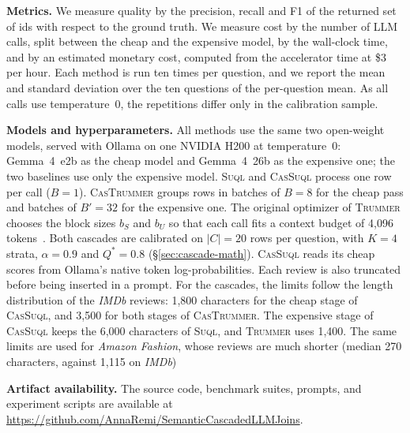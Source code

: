 \documentclass[sigconf]{acmart}
\begin{document}
\textbf{Metrics.} We measure quality by the precision, recall and F1 of the returned set of ids with respect to the ground truth. We measure cost by the number of LLM calls, split between the cheap and the expensive model, by the wall-clock time, and by an estimated monetary cost, computed from the accelerator time at \$3 per hour. Each method is run ten times per question, and we report the mean and standard deviation over the ten questions of the per-question mean. As all calls use temperature~0, the repetitions differ only in the calibration sample.

\textbf{Models and hyperparameters.} All methods use the same two open-weight models, served with Ollama on one NVIDIA H200 at temperature~0: Gemma~4~e2b as the cheap model and Gemma~4~26b as the expensive one; the two baselines use only the expensive model.
\textsc{Suql} and \textsc{CasSuql} process one row per call ($B{=}1$). \textsc{CasTrummer} groups rows in batches of $B{=}8$ for the cheap pass and batches of $B'{=}32$ for the expensive one.
The original optimizer of \textsc{Trummer} chooses the block sizes $b_S$ and $b_U$ so that each call fits a context budget of 4,096 tokens~\cite{trummer2025semanticjoin}.
Both cascades are calibrated on $|C|{=}20$ rows per question, with $K{=}4$ strata, $\alpha{=}0.9$ and $Q^\ast{=}0.8$ (\S\ref{sec:cascade-math}). \textsc{CasSuql} reads its cheap scores from Ollama's native token log-probabilities.
Each review is also truncated before being inserted in a prompt.
For the cascades, the limits follow the length distribution of the \textit{IMDb} reviews: 1,800 characters for the cheap stage of \textsc{CasSuql}, and 3,500 for both stages of \textsc{CasTrummer}.
The expensive stage of \textsc{CasSuql} keeps the 6,000 characters of \textsc{Suql}, and \textsc{Trummer} uses 1,400.
The same limits are used for \textit{Amazon Fashion}, whose reviews are much shorter (median 270 characters, against 1,115 on \textit{IMDb})

\textbf{Artifact availability.} The source code, benchmark suites, prompts, and experiment scripts are available at \url{https://github.com/AnnaRemi/SemanticCascadedLLMJoins}.
\end{document}
